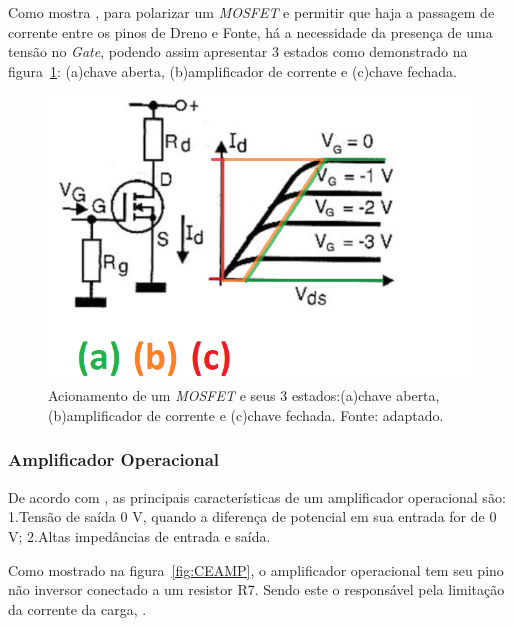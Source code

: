 Como mostra , para polarizar um \textit{MOSFET} e permitir que haja a passagem de corrente entre os pinos de Dreno e Fonte, há a necessidade da presença de uma tensão no \textit{Gate}, podendo assim apresentar 3 estados como demonstrado na figura~\ref{fig:MOSFET3}: (a)chave aberta, (b)amplificador  de corrente e (c)chave fechada.

\FloatBarrier
\begin{figure}[!htbp]
	\centering
	\includegraphics[scale=0.5]{imagens/MOSFET3}
	\caption{Acionamento de um \textit{MOSFET} e seus 3 estados:(a)chave aberta, (b)amplificador  de corrente e (c)chave fechada. Fonte:  adaptado.}
	\label{fig:MOSFET3}
\end{figure}
\FloatBarrier

\subsubsection{Amplificador Operacional}

De acordo com , as principais características de um amplificador operacional são: 1.Tensão de saída 0 V, quando a diferença de potencial em sua entrada for de 0 V; 2.Altas impedâncias de entrada e saída.

Como mostrado na figura~\ref{fig:CEAMP}, o amplificador operacional tem seu pino não inversor conectado a um resistor R7. Sendo este o responsável pela limitação da corrente da carga, \cite{ART2885}.

